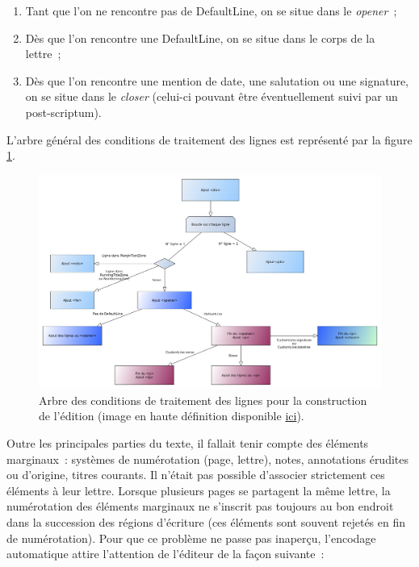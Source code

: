 \documentclass[a4paper,12pt,twoside]{book}
\begin{document}
			\begin{enumerate}
				\item Tant que l'on ne rencontre pas de \textsf{DefaultLine}, on se situe dans le \textit{opener}~;
				\item Dès que l'on rencontre une \textsf{DefaultLine}, on se situe dans le corps de la lettre~;
				\item Dès que l'on rencontre une mention de date, une salutation ou une signature, on se situe dans le \textit{closer} (celui-ci pouvant être éventuellement suivi par un post-scriptum).
			\end{enumerate}
		
			L'arbre général des conditions de traitement des lignes est représenté par la figure \ref{cond-body}.
			
			\begin{figure}[!h]
				\centering
				\includegraphics[width=15cm]{schema/build-body.png}
				\caption{Arbre des conditions de traitement des lignes pour la construction de l'édition (image en haute définition disponible \href{https://raw.githubusercontent.com/sbiay/CdS-edition/main/rapportBiay/schema/build-body.svg}{ici}).}
				\label{cond-body}
			\end{figure}
		
			Outre les principales parties du texte, il fallait tenir compte des éléments marginaux~: systèmes de numérotation (page, lettre), notes, annotations érudites ou d'origine, titres courants. Il n'était pas possible d'associer strictement ces éléments à leur lettre. Lorsque plusieurs pages se partagent la même lettre, la numérotation des éléments marginaux ne s'inscrit pas toujours au bon endroit dans la succession des régions d'écriture (ces éléments sont souvent rejetés en fin de numérotation). Pour que ce problème ne passe pas inaperçu, l'encodage automatique attire l'attention de l'éditeur de la façon suivante~:
			
\end{document}
